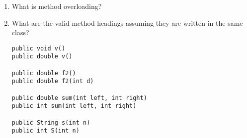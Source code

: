 \setcounter{counter}{1}
\begin{enumerate}[label={\arabic{counter}\addtocounter{counter}{1}}.]

\item What is method overloading? 

\item What are the valid method headings assuming they are written in the same class?
\begin{lstlisting}
public void v()
public double v()

public double f2()
public double f2(int d)

public double sum(int left, int right)
public int sum(int left, int right)

public String s(int n)
public int S(int n)
\end{lstlisting}

\end{enumerate}